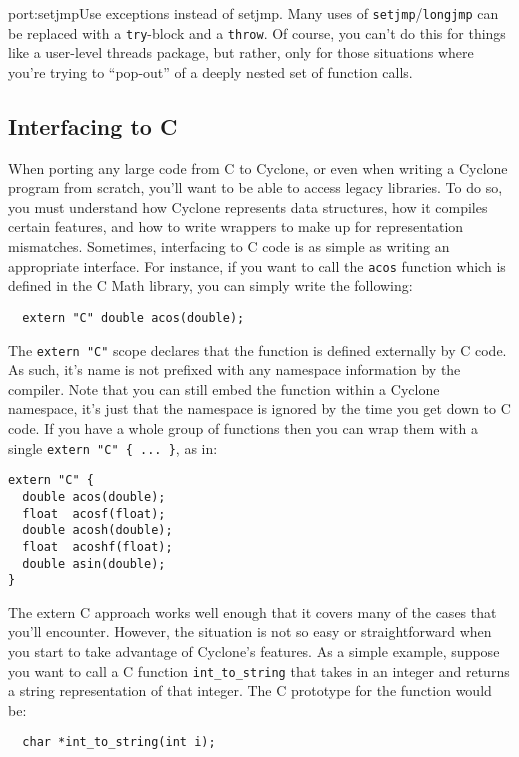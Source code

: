 \begin{porta}{port:setjmp}{Use exceptions instead of setjmp.}
Many uses of \texttt{setjmp}/\texttt{longjmp} can be replaced
with a \texttt{try}-block and a \texttt{throw}.  Of course,
you can't do this for things like a user-level threads package,
but rather, only for those situations where you're trying
to ``pop-out'' of a deeply nested set of function calls.
\end{porta}

\subsection{Interfacing to C}
When porting any large code from C to Cyclone, or even when writing
a Cyclone program from scratch, you'll want to be able to access
legacy libraries.  To do so, you must understand how Cyclone
represents data structures, how it compiles certain features,
and how to write wrappers to make up for representation mismatches.
Sometimes, interfacing to C code is as simple as writing
an appropriate interface.  For instance, if you want to
call the \texttt{acos} function which is defined in the C
Math library, you can simply write the following:
\begin{verbatim}
  extern "C" double acos(double);
\end{verbatim}

The \texttt{extern "C"} scope declares that the function is
defined externally by C code.  As such, it's name is not
prefixed with any namespace information by the compiler.
Note that you can still embed the function within a Cyclone
namespace, it's just that the namespace is ignored by the
time you get down to C code.  
If you have a whole group of functions then you can wrap them with
a single \texttt{extern "C" \{ ... \}}, as in:
\begin{verbatim}
extern "C" {
  double acos(double);
  float  acosf(float);
  double acosh(double);
  float  acoshf(float);
  double asin(double);
}
\end{verbatim}

The extern C approach works well enough that it covers many
of the cases that you'll encounter.  However, the situation is
not so easy or straightforward when you start to take advantage
of Cyclone's features.  As a simple example, suppose you want
to call a C function \texttt{int\_to\_string} that takes in
an integer and returns a string representation of that integer.
The C prototype for the function would be:
\begin{verbatim}
  char *int_to_string(int i);
\end{verbatim}

